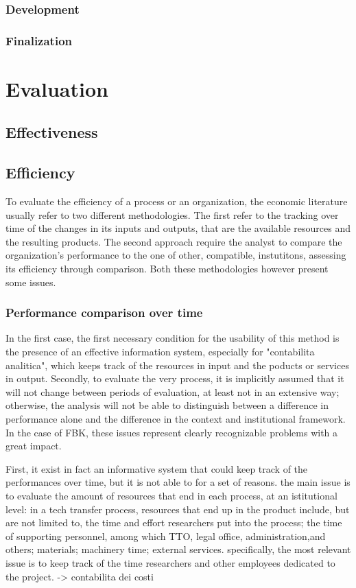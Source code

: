 \subsubsection{Development}
\subsubsection{Finalization}

\section{Evaluation}

\subsection{Effectiveness}

\subsection{Efficiency}

To evaluate the efficiency of a process or an organization, the economic literature usually refer to two different methodologies. The first refer to the tracking over time of the changes in its inputs and outputs, that are the available resources and the resulting products. The second approach require the analyst to compare the organization's performance to the one of other, compatible, instutitons, assessing its efficiency through comparison. Both these methodologies however present some issues.

\subsubsection{Performance comparison over time}

In the first case, the first necessary condition for the usability of this method is the presence of an effective information system, especially for "contabilita analitica", which keeps track of the resources in input and the poducts or services in output. Secondly, to evaluate the very process, it is implicitly assumed that it will not change between periods of evaluation, at least not in an extensive way; otherwise, the analysis will not be able to distinguish between a difference in performance alone and the difference in the context and institutional framework. In the case of FBK, these issues represent clearly recognizable problems with a great impact. 

First, it exist in fact an informative system that could keep track of the performances over time, but it is not able to for a set of reasons. the main issue is to evaluate the amount of resources that end in each process, at an istitutional level: in a tech transfer process, resources that end up in the product include, but are not limited to, the time and effort researchers put into the process; the time of supporting personnel, among which TTO, legal office, administration,and others; materials; machinery time; external services. specifically, the most relevant issue is to keep track of the time researchers and other employees dedicated to the project. -> contabilita dei costi

